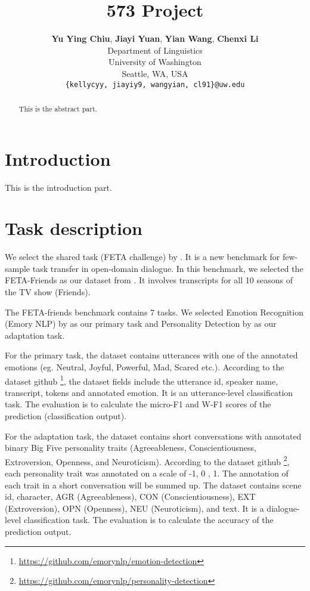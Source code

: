 \documentclass[11pt]{article}
\title{573 Project}
\author{{\bf Yu Ying Chiu},   {\bf Jiayi Yuan},   {\bf Yian Wang},   {\bf Chenxi Li} \\
        Department of Linguistics \\ University of Washington \\ Seattle, WA, USA \\
        \texttt{\{kellycyy, jiayiy9, wangyian, cl91\}@uw.edu}}
\begin{document}
\maketitle
\begin{abstract}
This is the abstract part.
\end{abstract}

\section{Introduction}
This is the introduction part.

\section{Task description}
We select the shared task (FETA challenge) by \citet{albalak-etal-2022-feta}. It is a new benchmark for few-sample task transfer in open-domain dialogue. In this benchmark, we selected the FETA-Friends as our dataset from \citet{chen2016character}. It involves transcripts for all 10 seasons of the TV show (Friends). 

The FETA-friends benchmark contains 7 tasks. We selected Emotion Recognition (Emory NLP) by \citet{zahiri2017emotion} as our primary task and Personality Detection by \citet{jiang2020automatic} as our adaptation task.

For the primary task, the dataset contains utterances with one of the annotated emotions (eg. Neutral, Joyful, Powerful, Mad, Scared etc.). According to the dataset github \footnote{\url{https://github.com/emorynlp/emotion-detection}}, the dataset fields include the utterance id, speaker name, transcript, tokens and annotated emotion. It is an utterance-level classification task. The evaluation is to calculate the micro-F1 and W-F1 scores of the prediction (classification output). 

For the adaptation task, the dataset contains short conversations with annotated binary Big Five personality traits (Agreeableness, Conscientiousness, Extroversion, Openness, and Neuroticism). According to the dataset github \footnote{\url{https://github.com/emorynlp/personality-detection}}, each personality trait was annotated on a scale of -1, 0 , 1. The annotation of each trait in a short conversation will be summed up. The dataset contains scene id, character, AGR (Agreeableness), CON (Conscientiousness), EXT (Extroversion), OPN (Openness), NEU (Neuroticism), and text. It is a dialogue-level classification task. The evaluation is to calculate the accuracy of the prediction output.
\end{document}
